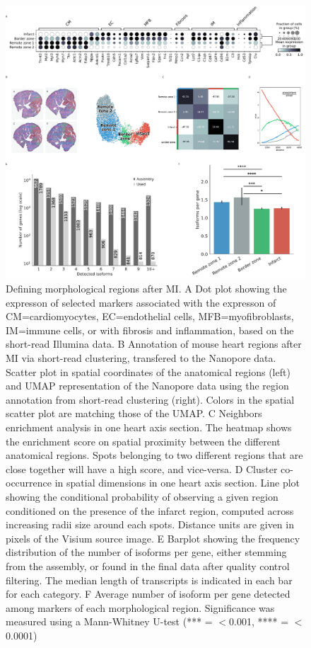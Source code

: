 \documentclass[utf8]{FrontiersinHarvard} %
\begin{document}
\begin{figure}[h!]
\begin{center}
\includegraphics[width=\textwidth]{figure2}
\end{center}
\caption{Defining morphological regions after MI. A Dot plot showing the expresson of selected markers associated with the expresson of CM=cardiomyocytes, EC=endothelial cells, MFB=myofibroblasts, IM=immune cells, or with fibrosis and inflammation, based on the short-read Illumina data. B Annotation of mouse heart regions after MI via short-read clustering, transfered to the Nanopore data. Scatter plot in spatial coordinates of the anatomical regions (left) and UMAP representation of the Nanopore data using the region annotation from short-read clustering (right). Colors in the spatial scatter plot are matching those of the UMAP. C Neighbors enrichment analysis in one heart axis section. The heatmap shows the enrichment score on spatial proximity between the different anatomical regions. Spots belonging to two different regions that are close together will have a high score, and vice-versa. D Cluster co-occurrence in spatial dimensions in one heart axis section. Line plot showing the conditional probability of observing a given region conditioned on the presence of the infarct region, computed across increasing radii size around each spots. Distance units are given in pixels of the Visium source image. E Barplot showing the frequency distribution of the number of isoforms per gene, either stemming from the assembly, or found in the final data after quality control filtering. The median length of transcripts is indicated in each bar for each category. F Average number of isoform per gene detected among markers of each morphological region. Significance was measured using a Mann-Whitney U-test (*** = $<$0.001, **** = $<$0.0001)}\label{fig:2}
\end{figure}
\end{document}
